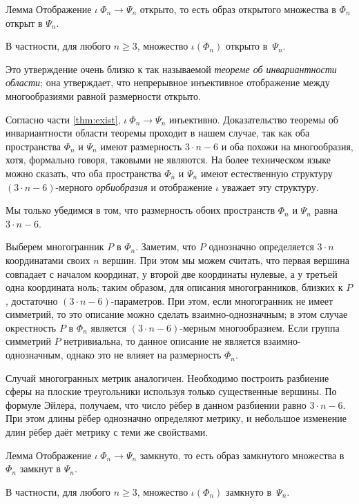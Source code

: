 \documentclass[oneside,a4paper]{article}
\begin{document}
\begin{thm}{Лемма}
Отображение $\iota\:\Phi_n\to\Psi_n$ открыто, 
то есть образ открытого множества в $\Phi_n$ открыт в $\Psi_n$.

В частности, для любого $n\ge 3$, множество $\iota(\Phi_n)$ открыто в~$\Psi_n$.
\end{thm}

Это утверждение очень близко к так называемой \emph{теореме об инвариантности области};
она утверждает, что непрерывное инъективное отображение между многообразиями равной размерности открыто.

Согласно части \ref{thm:exist}, $\iota\:\Phi_n\to\Psi_n$ инъективно.
Доказательство теоремы об инвариантности области теоремы проходит в нашем случае, так как оба пространства $\Phi_n$ и $\Psi_n$ имеют размерность $3\cdot n-6$ и оба похожи на многообразия, хотя, формально говоря, таковыми не являются.
На более техническом языке можно сказать, что оба пространства $\Phi_n$ и $\Psi_n$ имеют естественную структуру $(3\cdot n-6)$-мерного \emph{орбиобразия} и отображение $\iota$ уважает эту структуру.

Мы только убедимся в том, что размерность обоих пространств $\Phi_n$ и $\Psi_n$ равна $3\cdot n-6$.

Выберем многогранник $P$ в $\Phi_n$.
Заметим, что $P$ однозначно определяется $3\cdot n$ координатами своих $n$ вершин.
При этом мы можем считать, что первая вершина совпадает с началом координат, у второй две координаты нулевые, а у третьей одна координата ноль; таким образом, для описания многогранников, близких к $P$, достаточно $(3\cdot n-6)$-параметров.
При этом, если многогранник не имеет симметрий, то это описание можно сделать взаимно-однозначным;
в этом случае окрестность $P$ в $\Phi_n$ является $(3\cdot n-6)$-мерным многообразием.
Если группа симметрий $P$ нетривиальна,
то данное описание не является взаимно-однозначным, однако это не влияет на размерность $\Phi_n$.

Случай многогранных метрик аналогичен.
Необходимо построить разбиение сферы на плоские треугольники используя только существенные вершины.
По формуле Эйлера, получаем, что число рёбер в данном разбиении равно $3\cdot n-6$.
При этом длины рёбер однозначно определяют метрику, и небольшое изменение длин рёбер даёт метрику с теми же свойствами.


\begin{thm}{Лемма}
Отображение $\iota\:\Phi_n\to\Psi_n$ замкнуто, 
то есть образ замкнутого множества в $\Phi_n$ замкнут в $\Psi_n$.

В частности, для любого $n\ge 3$, множество $\iota(\Phi_n)$ замкнуто в~$\Psi_n$.
\end{thm}
\end{document}
